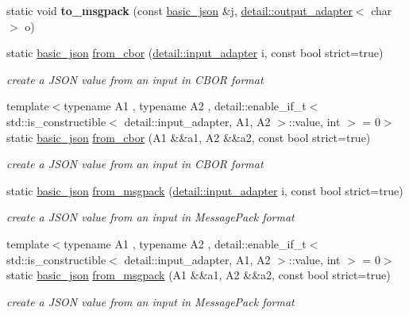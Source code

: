\begin{DoxyCompactItemize}
\mbox{\label{classnlohmann_1_1basic__json_a99efe44b502de2762a433ce3688ec2d2}} 
static void {\bfseries to\+\_\+msgpack} (const \mbox{\hyperlink{classnlohmann_1_1basic__json}{basic\+\_\+json}} \&j, \mbox{\hyperlink{classnlohmann_1_1detail_1_1output__adapter}{detail\+::output\+\_\+adapter}}$<$ char $>$ o)
\item 
static \mbox{\hyperlink{classnlohmann_1_1basic__json}{basic\+\_\+json}} \mbox{\hyperlink{classnlohmann_1_1basic__json_aa9be366b887378bb10c0f1ab510c2f0c}{from\+\_\+cbor}} (\mbox{\hyperlink{classnlohmann_1_1detail_1_1input__adapter}{detail\+::input\+\_\+adapter}} i, const bool strict=true)
\begin{DoxyCompactList}\small\item\em create a J\+S\+ON value from an input in C\+B\+OR format \end{DoxyCompactList}\item 
{\footnotesize template$<$typename A1 , typename A2 , detail\+::enable\+\_\+if\+\_\+t$<$ std\+::is\+\_\+constructible$<$ detail\+::input\+\_\+adapter, A1, A2 $>$\+::value, int $>$  = 0$>$ }\\static \mbox{\hyperlink{classnlohmann_1_1basic__json}{basic\+\_\+json}} \mbox{\hyperlink{classnlohmann_1_1basic__json_abc2393a8ce91f2cd25bc1c2ca96daf24}{from\+\_\+cbor}} (A1 \&\&a1, A2 \&\&a2, const bool strict=true)
\begin{DoxyCompactList}\small\item\em create a J\+S\+ON value from an input in C\+B\+OR format \end{DoxyCompactList}\item 
static \mbox{\hyperlink{classnlohmann_1_1basic__json}{basic\+\_\+json}} \mbox{\hyperlink{classnlohmann_1_1basic__json_aab804530006701b136ef9a0bc961434b}{from\+\_\+msgpack}} (\mbox{\hyperlink{classnlohmann_1_1detail_1_1input__adapter}{detail\+::input\+\_\+adapter}} i, const bool strict=true)
\begin{DoxyCompactList}\small\item\em create a J\+S\+ON value from an input in Message\+Pack format \end{DoxyCompactList}\item 
{\footnotesize template$<$typename A1 , typename A2 , detail\+::enable\+\_\+if\+\_\+t$<$ std\+::is\+\_\+constructible$<$ detail\+::input\+\_\+adapter, A1, A2 $>$\+::value, int $>$  = 0$>$ }\\static \mbox{\hyperlink{classnlohmann_1_1basic__json}{basic\+\_\+json}} \mbox{\hyperlink{classnlohmann_1_1basic__json_ad435a9e5851197bb8e3d727faf10abc5}{from\+\_\+msgpack}} (A1 \&\&a1, A2 \&\&a2, const bool strict=true)
\begin{DoxyCompactList}\small\item\em create a J\+S\+ON value from an input in Message\+Pack format \end{DoxyCompactList}\end{DoxyCompactItemize}
